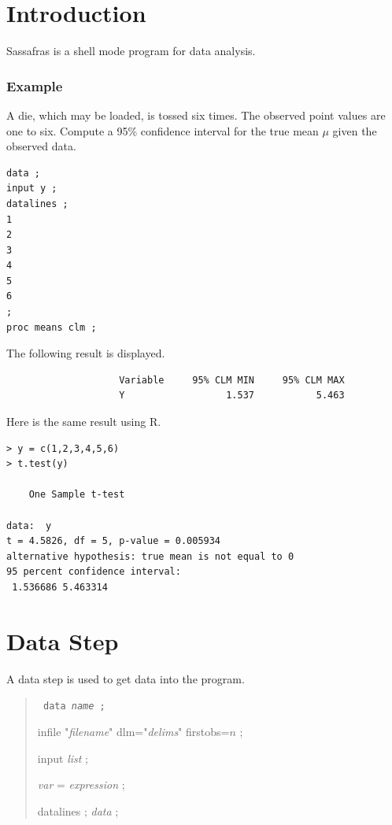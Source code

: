 \documentclass[12pt]{article}
\begin{document}
\renewcommand{\contentsname}{}
\tableofcontents

\newpage

\section{Introduction}

Sassafras is a shell mode program for data analysis.

\subsubsection*{Example}

A die, which may be loaded, is tossed six times.
The observed point values are one to six.
Compute a 95\% confidence interval for the true mean $\mu$
given the observed data.

{\footnotesize\begin{verbatim}
data ;
input y ;
datalines ;
1
2
3
4
5
6
;
proc means clm ;
\end{verbatim}}

The following result is displayed.

{\footnotesize\begin{verbatim}
                    Variable     95% CLM MIN     95% CLM MAX
                    Y                  1.537           5.463
\end{verbatim}}

Here is the same result using R.

{\footnotesize\begin{verbatim}
> y = c(1,2,3,4,5,6)
> t.test(y)

	One Sample t-test

data:  y
t = 4.5826, df = 5, p-value = 0.005934
alternative hypothesis: true mean is not equal to 0
95 percent confidence interval:
 1.536686 5.463314
\end{verbatim}}

\newpage

\section{Data Step}
A data step is used to get data into the program.

\begin{quote}
{\tt
data {\it name} ;

infile "{\it filename}" dlm="{\it delims}" firstobs=$n$ ;

input {\it list} ;

{\it var} = {\it expression} ;

datalines ; {\it data} ;
}
\end{quote}
\end{document}
